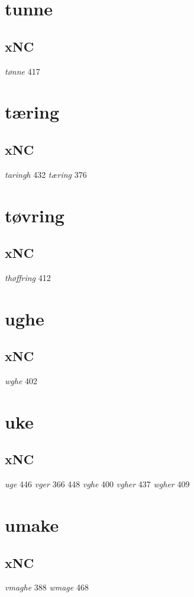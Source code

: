 \documentclass[a4paper,twocolumn]{article}
\begin{document}
\section{tunne}
\label{sec:org160e6c7}
\subsection{xNC}
\label{sec:org49fe5e6}
\emph{tønne} 417 
\section{tæring}
\label{sec:orgd0de5b4}
\subsection{xNC}
\label{sec:orge4dd1c8}
\emph{taringh} 432 \emph{tæring} 376 
\section{tøvring}
\label{sec:org4e8728d}
\subsection{xNC}
\label{sec:orgee28aef}
\emph{thøffring} 412 
\section{ughe}
\label{sec:orgf7d422d}
\subsection{xNC}
\label{sec:org13ecf1f}
\emph{wghe} 402 
\section{uke}
\label{sec:org06b2668}
\subsection{xNC}
\label{sec:org0f8edf5}
\emph{uge} 446 \emph{vger} 366 448 \emph{vghe} 400 \emph{vgher} 437 \emph{wgher} 409 
\section{umake}
\label{sec:org835ee71}
\subsection{xNC}
\label{sec:orga84635c}
\emph{vmaghe} 388 \emph{wmage} 468 
\end{document}

